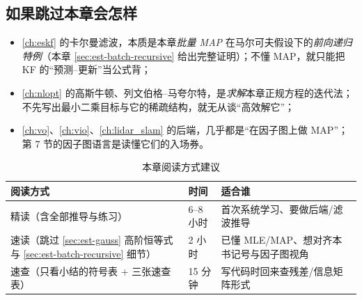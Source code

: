 \subsection*{如果跳过本章会怎样}
\begin{itemize}
  \item \cref{ch:eskf} 的卡尔曼滤波，本质是本章\emph{批量 MAP} 在马尔可夫假设下的\emph{前向递归特例}（本章 \cref{sec:est-batch-recursive} 给出完整证明）；不懂 MAP，就只能把 KF 的“预测–更新”当公式背；
  \item \cref{ch:nlopt} 的高斯牛顿、列文伯格–马夸尔特，是\emph{求解}本章正规方程的迭代法；不先写出最小二乘目标与它的稀疏结构，就无从谈“高效解它”；
  \item \cref{ch:vo}、\cref{ch:vio}、\cref{ch:lidar_slam} 的后端，几乎都是“在因子图上做 MAP”；第 7 节的因子图语言是读懂它们的入场券。
\end{itemize}

\begin{table}[ht]\centering\small
\caption{本章阅读方式建议}
\begin{tabular}{lll}
\toprule
阅读方式 & 时间 & 适合谁 \\
\midrule
精读（含全部推导与练习） & 6--8 小时 & 首次系统学习、要做后端/滤波推导 \\
速读（跳过 \cref{sec:est-gauss} 高阶恒等式与 \cref{sec:est-batch-recursive} 细节） & 2 小时 & 已懂 MLE/MAP、想对齐本书记号与因子图视角 \\
速查（只看小结的符号表 + 三张速查表） & 15 分钟 & 写代码时回来查残差/信息矩阵形式 \\
\bottomrule
\end{tabular}
\end{table}

